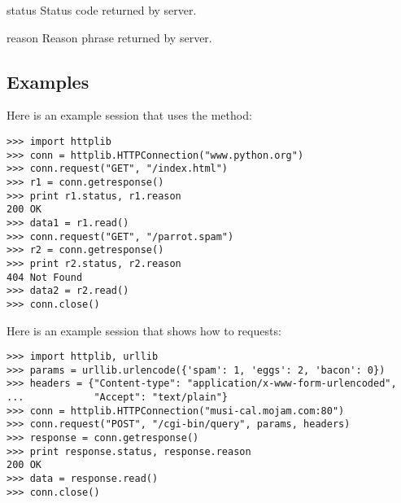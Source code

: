\begin{datadesc}{status}
  Status code returned by server.
\end{datadesc}

\begin{datadesc}{reason}
  Reason phrase returned by server.
\end{datadesc}


\subsection{Examples \label{httplib-examples}}

Here is an example session that uses the  method:

\begin{verbatim}
>>> import httplib
>>> conn = httplib.HTTPConnection("www.python.org")
>>> conn.request("GET", "/index.html")
>>> r1 = conn.getresponse()
>>> print r1.status, r1.reason
200 OK
>>> data1 = r1.read()
>>> conn.request("GET", "/parrot.spam")
>>> r2 = conn.getresponse()
>>> print r2.status, r2.reason
404 Not Found
>>> data2 = r2.read()
>>> conn.close()
\end{verbatim}

Here is an example session that shows how to  requests:

\begin{verbatim}
>>> import httplib, urllib
>>> params = urllib.urlencode({'spam': 1, 'eggs': 2, 'bacon': 0})
>>> headers = {"Content-type": "application/x-www-form-urlencoded",
...            "Accept": "text/plain"}
>>> conn = httplib.HTTPConnection("musi-cal.mojam.com:80")
>>> conn.request("POST", "/cgi-bin/query", params, headers)
>>> response = conn.getresponse()
>>> print response.status, response.reason
200 OK
>>> data = response.read()
>>> conn.close()
\end{verbatim}
